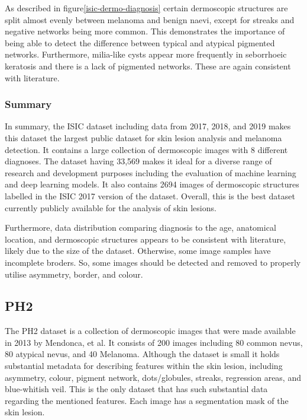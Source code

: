 As described in figure\ref{isic-dermo-diagnosis} certain dermoscopic structures are split almost evenly between melanoma and benign naevi, except for streaks and negative networks being more common. This demonstrates the importance of being able to detect the difference between typical and atypical pigmented networks. Furthermore, milia-like cysts appear more frequently in seborrhoeic keratosis and there is a lack of pigmented networks. These are again consistent with literature.

\subsubsection{Summary}
In summary, the ISIC dataset including data from 2017, 2018, and 2019 makes this dataset the largest public dataset for skin lesion analysis and melanoma detection. It contains a large collection of dermoscopic images with 8 different diagnoses. The dataset having 33,569 makes it ideal for a diverse range of research and development purposes including the evaluation of machine learning and deep learning models. It also contains 2694 images of dermoscopic structures labelled in the ISIC 2017 version of the dataset. Overall, this is the best dataset currently publicly available for the analysis of skin lesions.

Furthermore, data distribution comparing diagnosis to the age, anatomical location, and dermoscopic structures appears to be consistent with literature\cite{}, likely due to the size of the dataset. Otherwise, some image samples have incomplete broders. So, some images should be detected and removed to properly utilise asymmetry, border, and colour.

\subsection{PH2}
The PH2 dataset is a collection of dermoscopic images that were made available in 2013 by Mendonca, et al\cite{}. It consists of 200 images including 80 common nevus, 80 atypical nevus, and 40 Melanoma. Although the dataset is small it holds substantial metadata for describing features within the skin lesion, including asymmetry, colour, pigment network, dots/globules, streaks, regression areas, and blue-whitish veil. This is the only dataset that has such substantial data regarding the mentioned features. Each image has a segmentation mask of the skin lesion.


